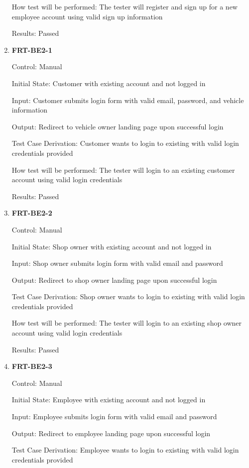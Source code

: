 \documentclass[12pt, titlepage]{article}
\begin{document}
\begin{enumerate}
	      How test will be performed: The tester will register and sign up for a new employee account using
	      valid sign up information

	      Results: Passed

	\item \textbf{FRT-BE2-1}

	      Control: Manual

	      Initial State: Customer with existing account and not logged in

	      Input: Customer submits login form with valid email, password, and vehicle information

	      Output: Redirect to vehicle owner landing page upon successful login

	      Test Case Derivation: Customer wants to login to existing with valid login credentials provided

	      How test will be performed: The tester will login to an existing customer account using valid login
	      credentials

	      Results: Passed

	\item \textbf{FRT-BE2-2}

	      Control: Manual

	      Initial State: Shop owner with existing account and not logged in

	      Input: Shop owner submits login form with valid email and password

	      Output: Redirect to shop owner landing page upon successful login

	      Test Case Derivation: Shop owner wants to login to existing with valid login credentials provided

	      How test will be performed: The tester will login to an existing shop owner account using valid
	      login credentials

	      Results: Passed

	\item \textbf{FRT-BE2-3}

	      Control: Manual

	      Initial State: Employee with existing account and not logged in

	      Input: Employee submits login form with valid email and password

	      Output: Redirect to employee landing page upon successful login

	      Test Case Derivation: Employee wants to login to existing with valid login credentials provided


\end{enumerate}
\end{document}
